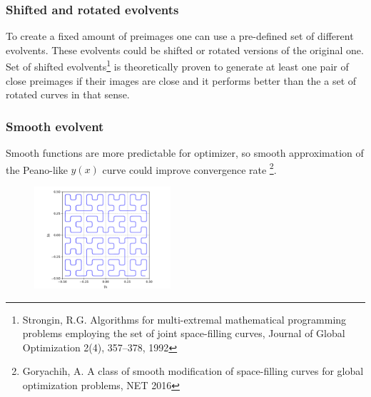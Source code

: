 \documentclass[aspectratio=1610]{beamer}
\begin{document}
\begin{frame}
  \frametitle{Shifted and rotated evolvents}
  To create a fixed amount of preimages one can use a pre-defined set of different evolvents. These evolvents could be shifted or rotated versions of the original one. Set of shifted evolvents\footnote{Strongin, R.G. Algorithms for multi-extremal mathematical programming problems employing the set of joint space-filling curves, Journal of Global Optimization 2(4), 357--378, 1992} is theoretically proven to generate at least one pair of close preimages if their images are close and it performs better than the a set of rotated curves in that sense.
  \begin{figure}[ht]
  \end{figure}
\end{frame}

\begin{frame}
  \frametitle{Smooth evolvent}
  Smooth functions are more predictable for optimizer, so smooth approximation of the Peano-like \(y(x)\) curve could improve convergence rate \footnote{Goryachih, A. A class of smooth modification of space-filling curves for global optimization problems, NET 2016}.
  \begin{figure}[ht]
    \includegraphics[width=0.45\textwidth]{evolvents/smooth.pdf}
  \end{figure}

\end{frame}
\end{document}
